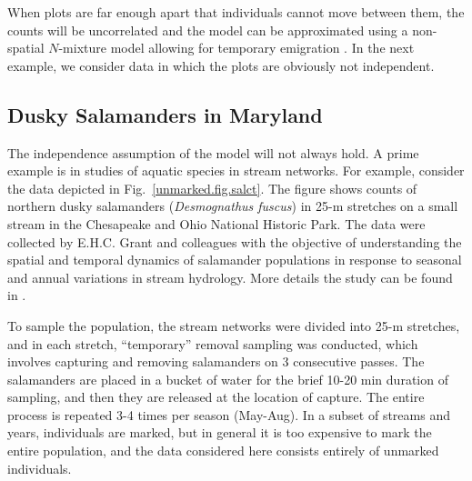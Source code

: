 When plots are far enough apart that
individuals cannot move between them, the counts will be uncorrelated
and the model can be approximated using a non-spatial $N$-mixture model
allowing for temporary emigration \citep{chandler_etal:2011}.
In the next example, we consider data in which the plots are obviously
not independent.


\subsection{Dusky Salamanders in Maryland}
The independence assumption of the \citet{chandler_etal:2011} model
will not always hold. A prime example is in studies of aquatic
species in stream networks. For example, consider the data depicted in
Fig.~\ref{unmarked.fig.salct}. %
The figure shows counts of
northern dusky salamanders
(\textit{Desmognathus fuscus}) in 25-m stretches on a small stream in the Chesapeake and
Ohio National Historic Park. The data were collected by E.H.C. Grant
and colleagues with the objective of understanding the spatial and
temporal dynamics of salamander populations in response to seasonal
and annual variations in stream
hydrology. %
More details the study can be found in \citet{grant_etal:2010}.

To sample the population, the stream networks were divided into 25-m
stretches,  %
and in each
stretch, ``temporary'' removal sampling was conducted, which involves
capturing and removing salamanders on 3 consecutive passes. The
salamanders are placed in a bucket of water for the brief 10-20 min
duration of sampling, and then they are released at the location of
capture. The entire process is repeated 3-4 times per season (May-Aug).
In a subset of streams and years, individuals
are marked, but in general it is too expensive to mark the entire
population, and the data considered here consists entirely of unmarked individuals.

